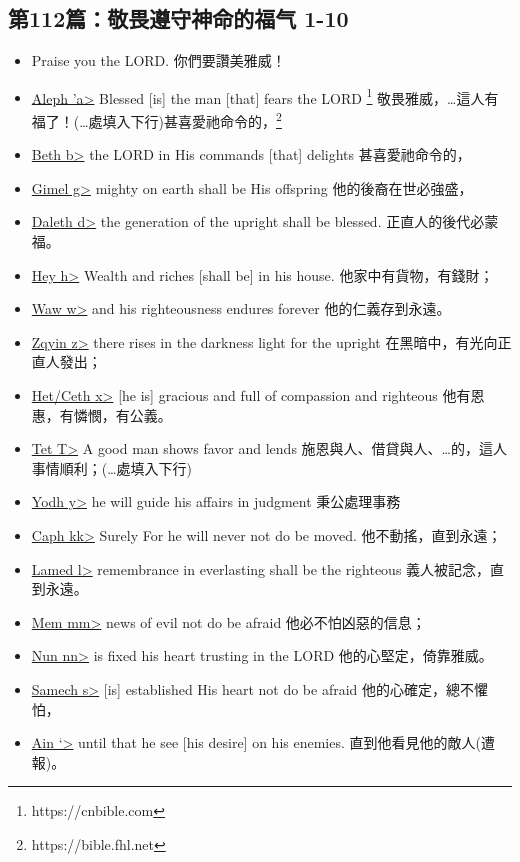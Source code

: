 \subsection{第112篇：敬畏遵守神命的福气 1-10}
\begin{itemize}
\itemsep-.45em  
\item Praise you the LORD. 你們要讚美雅威！
\item \underline{Aleph \<'a>} Blessed [is] the man [that] fears the LORD \footnote{https://cnbible.com}  敬畏雅威，…這人有福了！(…處填入下行)甚喜愛祂命令的，\footnote{https://bible.fhl.net}
\item \underline{Beth \<b>} the LORD in His commands [that] delights 甚喜愛祂命令的，
\item \underline{Gimel \<g>} mighty on earth shall be His offspring 他的後裔在世必強盛，
\item \underline{Daleth \<d>} the generation of the upright shall be blessed. 正直人的後代必蒙福。
\item \underline{Hey \<h>} Wealth and riches [shall be] in his house. 他家中有貨物，有錢財；
\item \underline{Waw \<w>} and his righteousness endures forever 他的仁義存到永遠。
\item \underline{Zqyin  \<z>} there rises in the darkness light for the upright 在黑暗中，有光向正直人發出；
\item \underline{Het/Ceth  \<x>} [he is] gracious and full of compassion and righteous 他有恩惠，有憐憫，有公義。
\item \underline{Tet  \<T>} A good man shows favor and lends 施恩與人、借貸與人、…的，這人事情順利；(…處填入下行)
\item \underline{Yodh \<y>} he will guide his affairs in judgment 秉公處理事務
\item \underline{Caph \<kk>} Surely For he will never not do be moved. 他不動搖，直到永遠； 
\item \underline{Lamed \<l>} remembrance in everlasting shall be the righteous  義人被記念，直到永遠。
\item \underline{Mem \<mm>} news of evil not do be afraid 他必不怕凶惡的信息；
\item \underline{Nun \<nn>} is fixed his heart trusting in the LORD 他的心堅定，倚靠雅威。
\item \underline{Samech \<s>} [is] established His heart not do be afraid 他的心確定，總不懼怕，
\item \underline{Ain \<`>} until that he see [his desire] on his enemies. 直到他看見他的敵人(遭報)。

\end{itemize}
